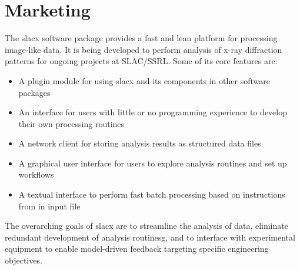 \section{Marketing}

The slacx software package provides 
a fast and lean platform for processing image-like data.
It is being developed to perform analysis of x-ray diffraction patterns 
for ongoing projects at SLAC/SSRL.
Some of its core features are:
\begin{itemize}
\item A plugin module for using slacx and its components in other software packages
\item An interface for users with little or no programming experience 
    to develop their own processing routines 
\item A network client for storing analysis results as structured data files 
\item A graphical user interface for users to explore analysis routines and set up workflows
\item A textual interface to perform fast batch processing based on instructions from in input file
\end{itemize}
The overarching goals of slacx are to streamline the analysis of data,
eliminate redundant development of analysis routinesg, 
and to interface with experimental equipment
to enable model-driven feedback targeting specific engineering objectives.


